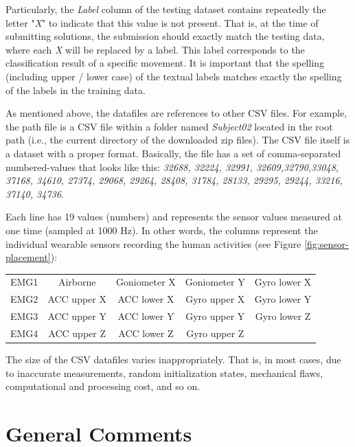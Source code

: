 Particularly, the \emph{Label} column of the testing dataset contains repeatedly the letter "\textit{X}"
to indicate that this value is not present. That is, at the time of submitting solutions, the submission should
exactly match the testing data, where each \emph{X} will be replaced by a label. This label corresponds to the
classification result of a specific movement. It is important that the spelling (including upper / lower
case) of the textual labels matches exactly the spelling of the labels in the training data.

As mentioned above, the datafiles are references to other CSV files. For example, the path file
 is a CSV file within a folder named \emph{Subject02}
located in the root path (i.e., the current directory of the downloaded zip files). The CSV file itself
is a dataset with a proper format. Basically, the file has a set of comma-separated numbered-values
that looks like this: \textit{32688, 32224, 32991, 32609,32790,33048, 37168, 34610, 27374, 29068, 29264,
28408, 31784, 28133, 29295, 29244, 33216, 37140, 34736}.

Each line has 19 values (numbers) and represents the sensor values measured at one time (sampled at
1000 Hz). In other words, the columns represent the individual wearable sensors recording the human
activities (see Figure \ref{fig:sensor-placement}):

\begin{center}
    \begin{tabular}{ c c c c c }
     EMG1 & Airborne    & Goniometer X & Goniometer Y & Gyro lower X \\
     EMG2 & ACC upper X & ACC lower X  & Gyro upper X & Gyro lower Y \\
     EMG3 & ACC upper Y & ACC lower Y  & Gyro upper Y & Gyro lower Z \\
     EMG4 & ACC upper Z & ACC lower Z  & Gyro upper Z &
    \end{tabular}
\end{center}


The size of the CSV datafiles varies inappropriately. That is, in most cases, due to inaccurate measurements,
random initialization states, mechanical flaws, computational and processing cost, and so on.


\section{General Comments}


